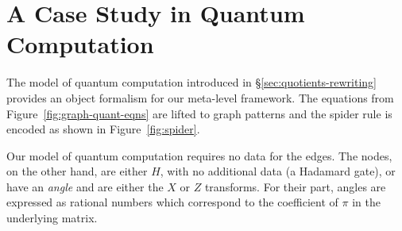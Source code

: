 \documentclass[runningheads]{llncs}
\begin{document}






 

\section{A Case Study in Quantum Computation}
\label{sec:case-study}

The model of quantum computation introduced in
\S\ref{sec:quotients-rewriting} provides an object formalism for our
meta-level framework. The equations from
Figure~\ref{fig:graph-quant-eqns} are lifted to graph patterns and the
spider rule is encoded as shown in Figure~\ref{fig:spider}.


Our model of quantum computation requires no data for the edges. The
nodes, on the other hand, are either $H$, with no additional data (a
Hadamard gate), or have an \emph{angle} and are either the $X$ or $Z$
transforms. For their part, angles are expressed as rational numbers
which correspond to the coefficient of $\pi$ in the underlying matrix.
\end{document}
